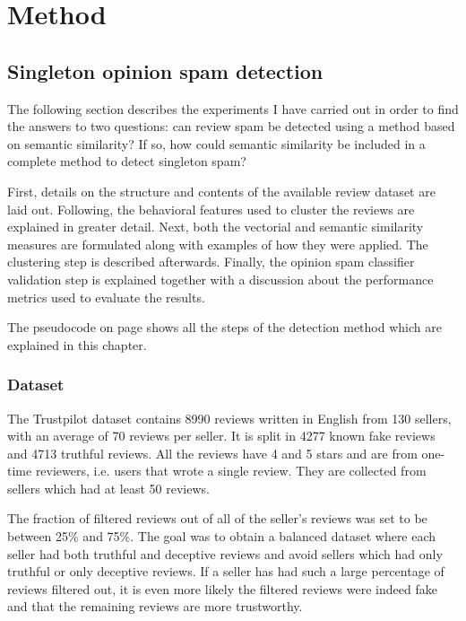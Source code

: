 \chapter{Method} 
\label{chapter:Method}
\section{Singleton opinion spam detection}\label{section:singleton-detection}

The following section describes the experiments I have carried out in order to find the answers to two questions: can review spam be detected using a method based on semantic similarity? If so, how could semantic similarity be included in a complete method to detect singleton spam?

First, details on the structure and contents of the available review dataset are laid out. Following, the behavioral features used to cluster the reviews are explained in greater detail. Next, both the vectorial and semantic similarity measures are formulated along with examples of how they were applied. The clustering step is described afterwards. Finally, the opinion spam classifier validation step is explained together with a discussion about the performance metrics used to evaluate the results. 

The pseudocode on page \pageref{alg:singleton} shows all the steps of the detection method which are explained in this chapter.

\subsection{Dataset}

The Trustpilot dataset contains 8990 reviews written in English from 130 sellers, with an average of 70 reviews per seller. It is split in 4277 known fake reviews and 4713 truthful reviews. All the reviews have 4 and 5 stars and are from one-time reviewers, i.e. users that wrote a single review. They are collected from sellers which had at least 50 reviews. 

The fraction of filtered reviews out of all of the seller's reviews was set to be between 25\% and 75\%. The goal was to obtain a balanced dataset where each seller had both truthful and deceptive reviews and avoid sellers which had only truthful or only deceptive reviews. If a seller has had such a large percentage of reviews filtered out, it is even more likely the filtered reviews were indeed fake and that the remaining reviews are more trustworthy. 

